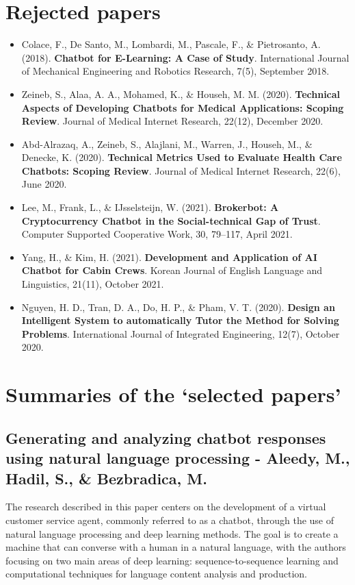 \documentclass[12pt, twoside]{article}
\begin{document}
\section{Rejected papers}
\begin{itemize}
\item Colace, F., De Santo, M., Lombardi, M., Pascale, F., \& Pietrosanto, A. (2018). \textbf{Chatbot for E-Learning: A Case of Study}. International Journal of Mechanical Engineering and Robotics Research, 7(5), September 2018.
\item Zeineb, S., Alaa, A. A., Mohamed, K., \& Househ, M. M. (2020). \textbf{Technical Aspects of Developing Chatbots for Medical Applications: Scoping Review}. Journal of Medical Internet Research, 22(12), December 2020.
\item Abd-Alrazaq, A., Zeineb, S., Alajlani, M., Warren, J., Househ, M., \& Denecke, K. (2020). \textbf{Technical Metrics Used to Evaluate Health Care Chatbots: Scoping Review}. Journal of Medical Internet Research, 22(6), June 2020.
\item Lee, M., Frank, L., \& IJsselsteijn, W. (2021). \textbf{Brokerbot: A Cryptocurrency Chatbot in the Social-technical Gap of Trust}. Computer Supported Cooperative Work, 30, 79–117, April 2021.
\item Yang, H., \& Kim, H. (2021). \textbf{Development and Application of AI Chatbot for Cabin Crews}. Korean Journal of English Language and Linguistics, 21(11), October 2021.
\item Nguyen, H. D., Tran, D. A., Do, H. P., \& Pham, V. T. (2020). \textbf{Design an Intelligent System to automatically Tutor the Method for Solving Problems}. International Journal of Integrated Engineering, 12(7), October 2020.
\end{itemize}

\section{Summaries of the ‘selected papers’}
\subsection{Generating and analyzing chatbot responses using natural language processing - Aleedy, M., Hadil, S., \& Bezbradica, M.\cite{1}}
The research described in this paper centers on the development of a virtual customer service agent, commonly referred to as a chatbot, through the use of natural language processing and deep learning methods. The goal is to create a machine that can converse with a human in a natural language, with the authors focusing on two main areas of deep learning: sequence-to-sequence learning and computational techniques for language content analysis and production.
\end{document}
